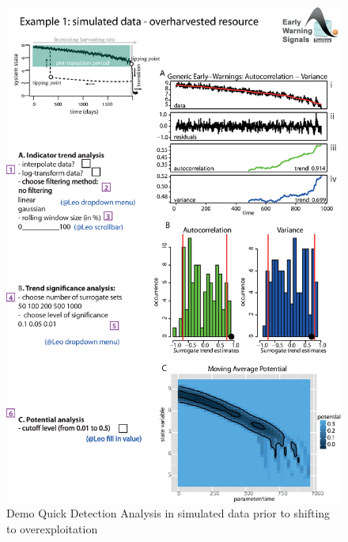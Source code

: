 \documentclass[12pt,a4paper,final]{article}
\begin{document}
\begin{doublespacing}

\begin{figure}[ht]
\begin{center}
\includegraphics[scale=0.8]{fig_2_simulated_970pts.eps}
\caption{Demo Quick Detection Analysis in simulated data prior to shifting to overexploitation}
\end{center}
\label{fig:simulatedQDA}
\end{figure}


\end{doublespacing}
\end{document}

